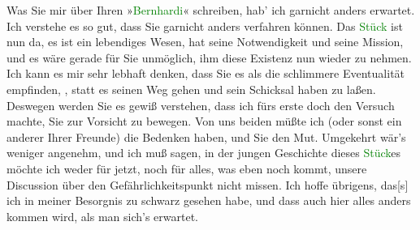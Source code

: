 \pstart
           Was Sie mir über Ihren »\textcolor{green}{Bernhardi}{}\ledrightnote{\textcolor{green}{Professor Bernhardi. Komödie in fünf Akten}}« schreiben,
               hab’ ich garnicht anders erwartet. Ich verstehe es so gut, dass Sie garnicht anders
               verfahren können. Das \textcolor{green}{Stück}{}\ledrightnote{{$\rightarrow$}\textcolor{green}{Professor Bernhardi. Komödie in fünf Akten}}
               ist nun da, es ist ein lebendiges Wesen, hat seine Notwendigkeit und seine Mission,
               und es wäre gerade für Sie unmöglich, ihm diese Existenz nun wieder zu nehmen. Ich
               kann es mir sehr lebhaft denken, dass Sie es als die schlimmere Eventualität
               empfinden, \label{K_L03558-2v}\label{K_L03558-2h}, statt es seinen
               Weg gehen und sein Schicksal haben zu laßen. Deswegen werden Sie es gewiß verstehen,
               dass ich fürs erste doch den Versuch machte, Sie zur Vorsicht zu bewegen. Von uns
               beiden müßte ich (oder sonst ein anderer Ihrer Freunde) die Bedenken haben, und Sie
               den Mut. Umgekehrt wär’s weniger angenehm, und ich muß sagen, in der jungen
               Geschichte dieses \textcolor{green}{Stück}{}\ledrightnote{{$\rightarrow$}\textcolor{green}{Professor Bernhardi. Komödie in fünf Akten}}es
               möchte ich weder für jetzt, noch für alles, was eben noch kommt, unsere Discussion
               über den Gefährlichkeitspunkt nicht missen. Ich hoffe übrigens,
                  das{[}s{]} ich in meiner Besorgnis zu schwarz gesehen habe, und
               dass auch hier alles anders kommen wird, als man sich’s erwartet.\pend
           
